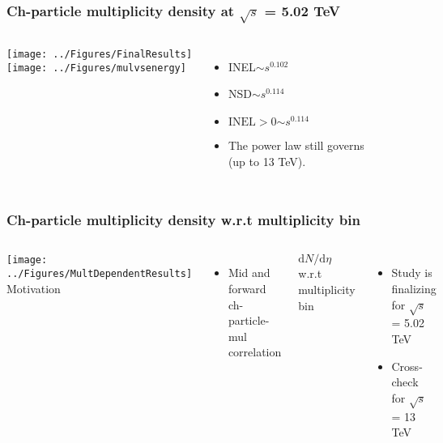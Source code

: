 \begin{frame}
\frametitle{Ch-particle multiplicity density at $\sqrt{s}$ = 5.02 TeV}
\begin{columns}[c]
\texttt{[image: ../Figures/FinalResults]}\\
\texttt{[image: ../Figures/mulvsenergy]}\\
\begin{itemize}
	\small
	\item{INEL\footnotemark[1] $\sim s^{0.102}$  }
	\item{NSD\footnotemark[2] $\sim s^{0.114}$  }  
	\item{$\mathrm{INEL>0}$\footnotemark[3] $\sim s^{0.114}$}
	\item{The power law still governs  \\(up to 13 TeV).}
\end{itemize}
\end{columns}
\end{frame}

\begin{frame}
\frametitle{Ch-particle multiplicity density w.r.t multiplicity bin}
\begin{columns}[c]
\centering
\texttt{[image: ../Figures/MultDependentResults]}\\
Motivation\\
\begin{itemize}
	\item{Mid and forward ch-particle-mul correlation}
\end{itemize}
$\mathrm{d}N/\mathrm{d}\eta$ w.r.t multiplicity bin
\begin{itemize}
	\item{Study is finalizing \\for $\sqrt{s}$ = 5.02 TeV}
	\item{Cross-check \\for $\sqrt{s}$ = 13 TeV}
\end{itemize}
\end{columns}
\end{frame}

